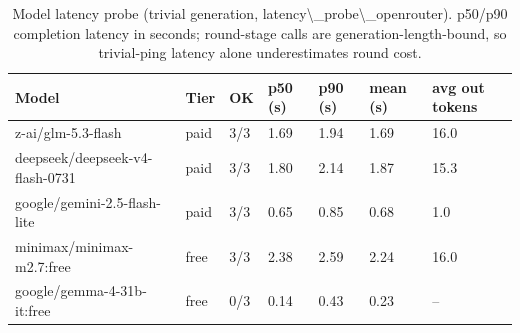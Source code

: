\begin{table}[H]
\centering\small
\caption{Model latency probe (trivial generation, latency\textbackslash{}\_probe\textbackslash{}\_openrouter). p50/p90 completion latency in seconds; round-stage calls are generation-length-bound, so trivial-ping latency alone underestimates round cost.}
\label{tab:latency-latency-probe-openrouter}
\begin{tabular}{lllllll}
\toprule
Model & Tier & OK & p50 (s) & p90 (s) & mean (s) & avg out tokens \\
\midrule
z-ai/glm-5.3-flash & paid & 3/3 & 1.69 & 1.94 & 1.69 & 16.0 \\
deepseek/deepseek-v4-flash-0731 & paid & 3/3 & 1.80 & 2.14 & 1.87 & 15.3 \\
google/gemini-2.5-flash-lite & paid & 3/3 & 0.65 & 0.85 & 0.68 & 1.0 \\
minimax/minimax-m2.7:free & free & 3/3 & 2.38 & 2.59 & 2.24 & 16.0 \\
google/gemma-4-31b-it:free & free & 0/3 & 0.14 & 0.43 & 0.23 & -- \\
\bottomrule
\end{tabular}
\end{table}
